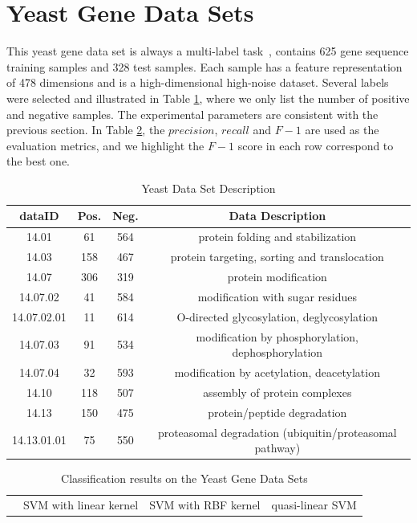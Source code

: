 \documentclass[master]{IPSstyle}
\begin{document}
{\section{Yeast Gene Data Sets}\label{Yeast}
This yeast gene data set is always a multi-label task~\cite{barutcuoglu2006hierarchical,elisseeff2001kernel}, contains 625 gene sequence training samples and 328 test samples. Each sample has a feature representation of 478 dimensions and is a high-dimensional high-noise dataset. Several labels were selected and illustrated in Table \ref{tabledescription}, where we only list the number of positive and negative samples. The experimental parameters are consistent with the previous section. In Table \ref{tableyeast}, the $precision$, $recall$ and $F-1$ are used as the evaluation metrics, and we highlight the $F-1$ score in each row correspond to the best one. 
\begin{table}[H]
\centering \caption{Yeast Data Set Description\label{tabledescription}}
\begin{tabular}{c|c|c|c}
\hline
 dataID & Pos. & Neg. & Data Description \\
 \hline\hline
14.01 & 61 & 564 & protein folding and stabilization\\
14.03 & 158 & 467 & protein targeting, sorting and translocation\\
14.07 & 306 & 319 & protein modification\\
14.07.02 & 41 & 584 & modification with sugar residues\\
14.07.02.01 & 11 & 614 & O-directed glycosylation, deglycosylation\\
14.07.03 & 91 & 534 & modification by phosphorylation, dephosphorylation\\
14.07.04 & 32 & 593 & modification by acetylation, deacetylation\\
14.10 & 118 & 507 & assembly of protein complexes\\
14.13 & 150 & 475 & protein/peptide degradation\\
14.13.01.01 & 75 & 550 & proteasomal degradation (ubiquitin/proteasomal pathway)\\
\hline
\end{tabular}
\end{table}
\begin{table}[H]
\centering \caption{Classification results on the Yeast Gene Data Sets\label{tableyeast}}
\begin{tabular}{c|ccc|ccc|ccc}
\hline
  & \multicolumn{3}{c|}{SVM with linear kernel} & \multicolumn{3}{c|}{SVM with RBF kernel}  & \multicolumn{3}{c}{quasi-linear SVM}

\end{tabular}
\end{table}}
\end{document}
